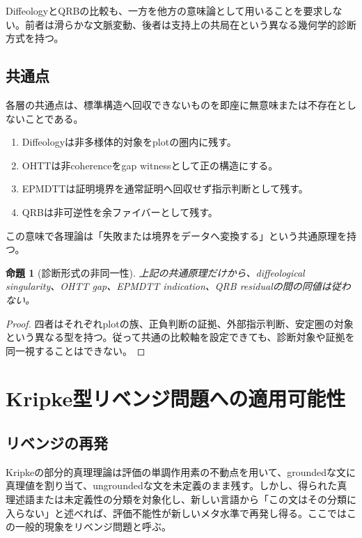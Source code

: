 \documentclass[a4paper,11pt]{ltjsarticle}
\theoremstyle{definition}
\theoremstyle{plain}
\newtheorem{proposition}[definition]{命題}
\begin{document}
DiffeologyとQRBの比較も、一方を他方の意味論として用いることを要求しない。前者は滑らかな文脈変動、後者は支持上の共局在という異なる幾何学的診断方式を持つ。

\subsection{共通点}

各層の共通点は、標準構造へ回収できないものを即座に無意味または不存在としないことである。
\begin{enumerate}
 \item Diffeologyは非多様体的対象をplotの圏内に残す。
 \item OHTTは非coherenceをgap witnessとして正の構造にする。
 \item EPMDTTは証明境界を通常証明へ回収せず指示判断として残す。
 \item QRBは非可逆性を余ファイバーとして残す。
\end{enumerate}

この意味で各理論は「失敗または境界をデータへ変換する」という共通原理を持つ。

\begin{proposition}[診断形式の非同一性]
上記の共通原理だけから、diffeological singularity、OHTT gap、EPMDTT indication、QRB residualの間の同値は従わない。
\end{proposition}

\begin{proof}
四者はそれぞれplotの族、正負判断の証拠、外部指示判断、安定圏の対象という異なる型を持つ。従って共通の比較軸を設定できても、診断対象や証拠を同一視することはできない。
\end{proof}

\section{Kripke型リベンジ問題への適用可能性}

\subsection{リベンジの再発}

Kripkeの部分的真理理論は評価の単調作用素の不動点を用いて、groundedな文に真理値を割り当て、ungroundedな文を未定義のまま残す\cite{kripke}。しかし、得られた真理述語または未定義性の分類を対象化し、新しい言語から「この文はその分類に入らない」と述べれば、評価不能性が新しいメタ水準で再発し得る。ここではこの一般的現象をリベンジ問題と呼ぶ。
\end{document}
